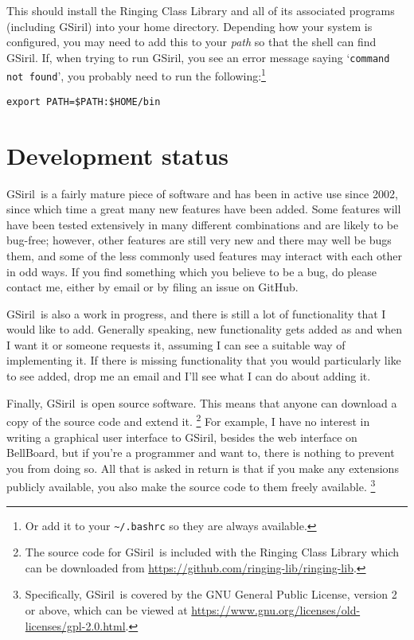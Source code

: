 \documentclass[a4paper,11pt,oneside]{book}
\makeatletter
\newcommand{\fspec}[1]{\index{#1@{\hspace*{-\fspecwidth}\texttt{\$#1}}}}
\def\gsiril{GSiril}
\makeatother
\begin{document}
This should install the Ringing Class Library 
and all of its associated programs (including \gsiril) into your home 
directory.  Depending how your system is configured, you may need to add this
to your \textit{path} so that the shell can find
\gsiril.  If, when trying to run \gsiril, you see an error message
saying `\texttt{command not found}', you 
probably need to run the following:\footnote{Or add it to your 
\verb+~/.bashrc+ so they are always available.}\fspec{PATH}
\begin{Verbatim}
export PATH=$PATH:$HOME/bin
\end{Verbatim}

\section{Development status}
\label{dev_status}

\gsiril\ is a fairly mature piece of software and has been in active
use since 2002, since which time a great many new features have been added.
Some features will have been tested extensively in many different 
combinations and are likely to be bug-free; however, other features are
still very new and there may well be bugs them, and some of the less
commonly used features may interact with each other in odd ways.
If you find something which you believe to be a bug,%
 do please contact me, either by email or by filing an
issue on GitHub.

\gsiril\ is also a work in progress, and there is still a lot of
functionality that I would like to add.  Generally speaking, new
functionality gets added as and when I want it or someone requests it,
assuming I can see a suitable way of implementing it.  If there is
missing functionality that you would particularly like to see added,
drop me an email and I'll see what I can do about adding it.

Finally, \gsiril\ is open source software.
This means that anyone 
can download a copy of the source code and extend it.%
\footnote{The source code for \gsiril\ is included with the 
Ringing Class Library which can be downloaded from 
\url{https://github.com/ringing-lib/ringing-lib}.}
For example, I have no interest in writing a graphical user interface to
\gsiril, besides the web interface on BellBoard, but if you're a
programmer and want to, there is nothing to prevent you from doing so.
All that is asked in return is that if you make any extensions publicly
available, you also make the source code to them freely available.%
\footnote{Specifically, \gsiril\ is covered by the GNU General Public 
License, version 2 or above, which can be viewed at
\url{https://www.gnu.org/licenses/old-licenses/gpl-2.0.html}.}
\end{document}
